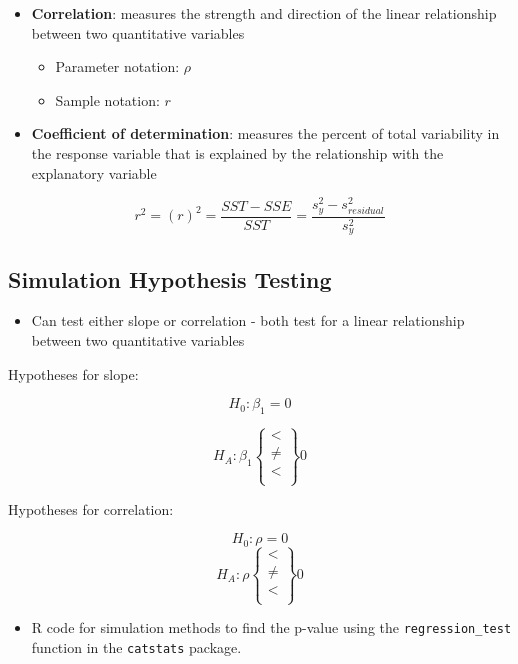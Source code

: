 \documentclass[
]{report}
\providecommand{\tightlist}{%
  \setlength{\itemsep}{0pt}\setlength{\parskip}{0pt}}
\begin{document}
\begin{itemize}
\item
  \textbf{Correlation}: measures the strength and direction of the linear relationship between two quantitative variables

  \begin{itemize}
  \item
    Parameter notation: \(\rho\)
  \item
    Sample notation: \(r\)
  \end{itemize}
\item
  \textbf{Coefficient of determination}: measures the percent of total variability in the response variable that is explained by the relationship with the explanatory variable
\end{itemize}

\[r^2 = (r)^2 = \frac{SST - SSE}{SST} = \frac{s^2_y - s^2_{residual}}{s^2_y}\]

\subsection*{Simulation Hypothesis Testing}\label{simulation-hypothesis-testing-1}

\begin{itemize}
\tightlist
\item
  Can test either slope or correlation - both test for a linear relationship between two quantitative variables
\end{itemize}

Hypotheses for slope:

\[H_0: \beta_1 = 0\]

\[H_A: \beta_1 \left\{
\begin{array}{ll}
< \\
\ne \\
< \\
\end{array}
\right\}
0\]

Hypotheses for correlation:

\[H_0: \rho = 0\]
\[H_A: \rho \left\{
\begin{array}{ll}
< \\
\ne \\
< \\
\end{array}
\right\}
0\]

\begin{itemize}
\tightlist
\item
  R code for simulation methods to find the p-value using the \texttt{regression\_test} function in the \texttt{catstats} package.
\end{itemize}
\end{document}
